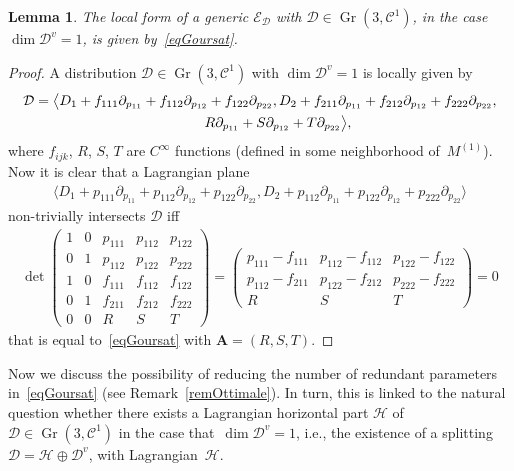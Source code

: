 \documentclass[10pt,a4paper]{amsart}
\newcommand{\C}{\mathcal{C}}
\newcommand{\D}{\mathcal{D}}
\newcommand{\A}{\boldsymbol{A}}
\newcommand{\E}{\mathcal{E}}
\newcommand{\Gr}{\operatorname{Gr}}
\numberwithin{equation}{section}
\newtheorem{Lemma}[Theorem]{Lemma}
\begin{document}
\begin{Lemma}
\label{Lemma-ex-Considerazioni-Forma-Generale}
The local form of a generic $\E_\D$ with $\D\in\Gr(3, \C^1)$, in the case $\dim\D^v=1$, is given by~\eqref{eqGoursat}.
\end{Lemma}
\begin{proof}
A distribution $\D\in\Gr(3, \C^1)$ with $\dim\D^v=1$ is locally given by
\begin{gather*}
\D=\big\langle D_1+f_{111}\partial_{p_{11}} +f_{112}\partial_{p_{12}} +f_{122}\partial_{p_{22}} , D_2+f_{211}\partial_{p_{11}} +f_{212}\partial_{p_{12}} +f_{222}\partial_{p_{22}}, \\
\hphantom{\D=\big\langle}{} R\partial_{p_{11}} +S\partial_{p_{12}} +T\partial_{p_{22}} \big\rangle,
\end{gather*}
where $f_{ijk}$, $R$, $S$, $T$ are $C^\infty$ functions (def\/ined in some neighborhood of~$M^{(1)}$). Now it is clear that a Lagrangian plane
\begin{gather*}
\langle D_1+p_{111}\partial_{p_{11}} +p_{112}\partial_{p_{12}} +p_{122}\partial_{p_{22}} , D_2+p_{112}\partial_{p_{11}} +p_{122}\partial_{p_{12}} +p_{222}\partial_{p_{22}} \rangle
\end{gather*}
non-trivially intersects $\D$ if\/f
\begin{gather*}
\det
\left(
\begin{matrix}
1 & 0 & p_{111} & p_{112} & p_{122}
\\
0 & 1 & p_{112} & p_{122} & p_{222}
\\
1 & 0 & f_{111} & f_{112} & f_{122}
\\
0 & 1 & f_{211} & f_{212} & f_{222}
\\
0 & 0 & R & S & T
\end{matrix}
\right)
=
\left(
\begin{matrix}
p_{111}-f_{111} & p_{112}-f_{112} & p_{122}-f_{122}
\\
p_{112}-f_{211} & p_{122}-f_{212} & p_{222}-f_{222}
\\
R & S & T
\end{matrix}
\right)=0
\end{gather*}
that is equal to~\eqref{eqGoursat} with $\A=(R,S,T)$.
\end{proof}

Now we discuss the possibility of reducing the number of redundant parameters in~\eqref{eqGoursat} (see Remark~\ref{remOttimale}). In turn, this is linked to the natural question whether there exists a Lagrangian horizontal part $\mathcal{H}$ of $\mathcal{D}\in\Gr(3,\C^1)$ in the case that~$\dim\mathcal{D}^v=1$, i.e., the existence of a splitting $\mathcal{D}=\mathcal{H}\oplus\mathcal{D}^v$, with Lagrangian~$\mathcal{H}$.
\end{document}
